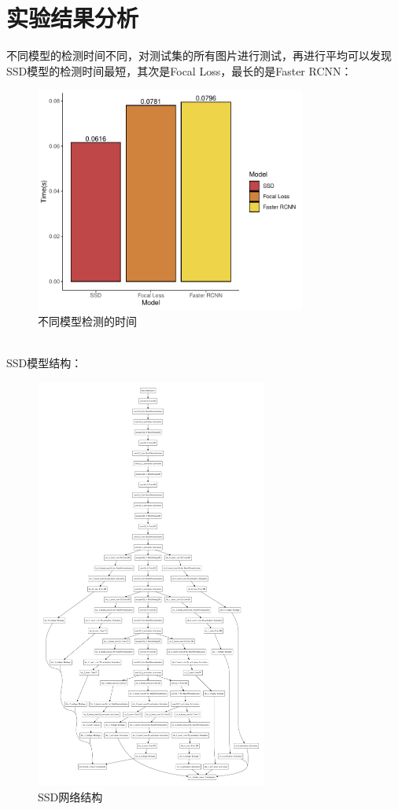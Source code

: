 \documentclass[journal,transmag]{IEEEtran}
\begin{document}
\section{实验结果分析}
不同模型的检测时间不同，对测试集的所有图片进行测试，再进行平均可以发现SSD模型的检测时间最短，其次是Focal Loss，最长的是Faster RCNN：
\begin{figure}[h]
\centering
\includegraphics[width=3.5in]{time.pdf}
\caption{不同模型检测的时间}
\end{figure}\\

SSD模型结构：
\begin{figure}[h]
\centering
\includegraphics[width=3in]{modelgraph.pdf}
\caption{SSD网络结构}
\end{figure}
\end{document}
